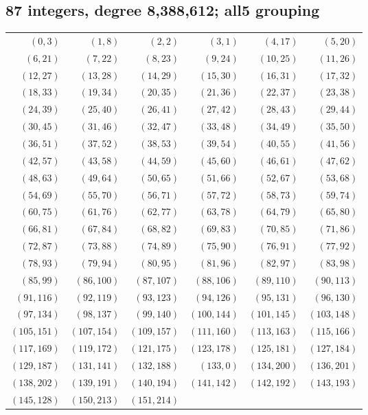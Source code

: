 \subsection*{87 integers, degree 8,388,612; all5 grouping}
\begingroup\small
\begin{longtable}{rrrrrr}
$(0,3)$ & $(1,8)$ & $(2,2)$ & $(3,1)$ & $(4,17)$ & $(5,20)$\\
$(6,21)$ & $(7,22)$ & $(8,23)$ & $(9,24)$ & $(10,25)$ & $(11,26)$\\
$(12,27)$ & $(13,28)$ & $(14,29)$ & $(15,30)$ & $(16,31)$ & $(17,32)$\\
$(18,33)$ & $(19,34)$ & $(20,35)$ & $(21,36)$ & $(22,37)$ & $(23,38)$\\
$(24,39)$ & $(25,40)$ & $(26,41)$ & $(27,42)$ & $(28,43)$ & $(29,44)$\\
$(30,45)$ & $(31,46)$ & $(32,47)$ & $(33,48)$ & $(34,49)$ & $(35,50)$\\
$(36,51)$ & $(37,52)$ & $(38,53)$ & $(39,54)$ & $(40,55)$ & $(41,56)$\\
$(42,57)$ & $(43,58)$ & $(44,59)$ & $(45,60)$ & $(46,61)$ & $(47,62)$\\
$(48,63)$ & $(49,64)$ & $(50,65)$ & $(51,66)$ & $(52,67)$ & $(53,68)$\\
$(54,69)$ & $(55,70)$ & $(56,71)$ & $(57,72)$ & $(58,73)$ & $(59,74)$\\
$(60,75)$ & $(61,76)$ & $(62,77)$ & $(63,78)$ & $(64,79)$ & $(65,80)$\\
$(66,81)$ & $(67,84)$ & $(68,82)$ & $(69,83)$ & $(70,85)$ & $(71,86)$\\
$(72,87)$ & $(73,88)$ & $(74,89)$ & $(75,90)$ & $(76,91)$ & $(77,92)$\\
$(78,93)$ & $(79,94)$ & $(80,95)$ & $(81,96)$ & $(82,97)$ & $(83,98)$\\
$(85,99)$ & $(86,100)$ & $(87,107)$ & $(88,106)$ & $(89,110)$ & $(90,113)$\\
$(91,116)$ & $(92,119)$ & $(93,123)$ & $(94,126)$ & $(95,131)$ & $(96,130)$\\
$(97,134)$ & $(98,137)$ & $(99,140)$ & $(100,144)$ & $(101,145)$ & $(103,148)$\\
$(105,151)$ & $(107,154)$ & $(109,157)$ & $(111,160)$ & $(113,163)$ & $(115,166)$\\
$(117,169)$ & $(119,172)$ & $(121,175)$ & $(123,178)$ & $(125,181)$ & $(127,184)$\\
$(129,187)$ & $(131,141)$ & $(132,188)$ & $(133,0)$ & $(134,200)$ & $(136,201)$\\
$(138,202)$ & $(139,191)$ & $(140,194)$ & $(141,142)$ & $(142,192)$ & $(143,193)$\\
$(145,128)$ & $(150,213)$ & $(151,214)$ & & &\\
\end{longtable}
\endgroup
